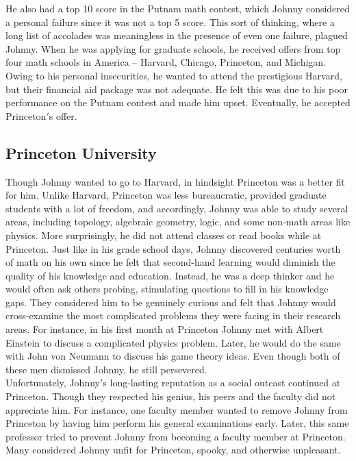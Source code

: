 \documentclass[12pt]{article}
\begin{document}
He also had a top 10 score in the Putnam math contest, which Johnny considered a personal failure since it was not a top 5 score. This sort of thinking, where a long list of accolades was meaningless in the presence of even one failure, plagued Johnny. When he was applying for graduate schools, he received offers from top four math schools in America – Harvard, Chicago, Princeton, and Michigan. Owing to his personal insecurities, he wanted to attend the prestigious Harvard, but their financial aid package was not adequate. He felt this was due to his poor performance on the Putnam contest and made him upset. Eventually, he accepted Princeton$'$s offer.

\subsection{Princeton University}

Though Johnny wanted to go to Harvard, in hindsight Princeton was a better fit for him. Unlike Harvard, Princeton was less bureaucratic, provided graduate students with a lot of freedom, and accordingly, Johnny was able to study several areas, including topology, algebraic geometry, logic, and some non-math areas like physics. More surprisingly, he did not attend classes or read books while at Princeton. Just like in his grade school days, Johnny discovered centuries worth of math on his own since he felt that second-hand learning would diminish the quality of his knowledge and education. Instead, he was a deep thinker and he would often ask others probing, stimulating questions to fill in his knowledge gaps. They considered him to be genuinely curious and felt that Johnny would cross-examine the most complicated problems they were facing in their research areas. For instance, in his first month at Princeton Johnny met with Albert Einstein to discuss a complicated physics problem. Later, he would do the same with John von Neumann to discuss his game theory ideas. Even though both of these men dismissed Johnny, he still persevered.\\

Unfortunately, Johnny$'$s long-lasting reputation as a social outcast continued at Princeton. Though they respected his genius, his peers and the faculty did not appreciate him. For instance, one faculty member wanted to remove Johnny from Princeton by having him perform his general examinations early. Later, this same professor tried to prevent Johnny from becoming a faculty member at Princeton. Many considered Johnny unfit for Princeton, spooky, and otherwise unpleasant.\\
\end{document}
